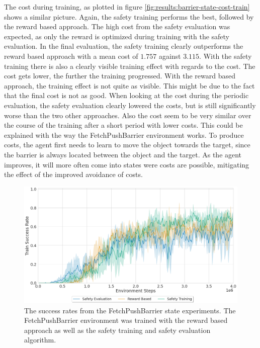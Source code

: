 The cost during training, as plotted in figure \ref{fig:results:barrier-state-cost-train} shows a similar picture. Again, the safety training performs the best, followed by the reward based approach. The high cost from the safety evaluation was expected, as only the reward is optimized during training with the safety evaluation. In the final evaluation, the safety training clearly outperforms the reward based approach with a mean cost of $1.757$ against $3.115$. With the safety training there is also a clearly visible training effect with regards to the cost. The cost gets lower, the further the training progressed. With the reward based approach, the training effect is not quite as visible. This might be due to the fact that the final cost is not as good. When looking at the cost during the periodic evaluation, the safety evaluation clearly lowered the costs, but is still significantly worse than the two other approaches. Also the cost seem to be very similar over the course of the training after a short period with lower costs. This could be explained with the way the FetchPushBarrier  environment works. To produce costs, the agent first needs to learn to move the object towards the target, since the barrier is always located between the object and the target. As the agent improves, it will more often come into states were costs are possible, mitigating the effect of the improved avoidance of costs.

\begin{figure}
    \centering
    \includegraphics[width=\textwidth]{images/results/push-barrier-state/success.png}
    \caption[The success rates from on the FetchPushBarrier state experiments.]{The success rates from the FetchPushBarrier state experiments. The FetchPushBarrier environment was trained with the reward based approach as well as the safety training and safety evaluation algorithm.}
    \label{fig:results:barrier-state-success}
\end{figure}

